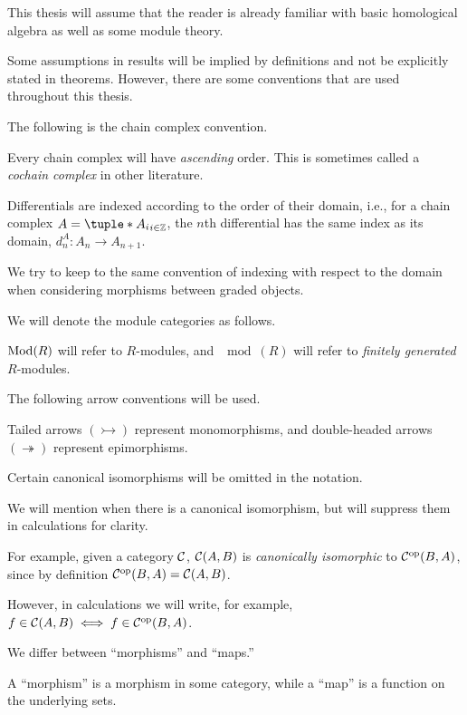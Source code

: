 This thesis will assume that the reader is already familiar with basic homological algebra as well as some module theory.

Some assumptions in results will be implied by definitions and not be explicitly stated in theorems. However, there are some conventions that are used throughout this thesis.

The following is the chain complex convention.
\begin{notation}
    \label{not:chain_complex}
    Every chain complex will have \emph{ascending} order. This is sometimes called a \emph{cochain complex} in other literature.

    Differentials are indexed according to the order of their domain, i.e., for a chain complex \( A = \tuple*{A_i}_{i \in \Zb} \), the \( n \)th differential has the same index as its domain, \( d_n^A: A_n \to A_{n + 1} \).
    
    We try to keep to the same convention of indexing with respect to the domain when considering morphisms between graded objects.
\end{notation}

We will denote the module categories as follows.
\begin{notation}
    \( \operatorname{Mod}(R) \) will refer to \( R \)-modules, and \( \mod(R) \) will refer to \emph{finitely generated} \( R \)-modules.
\end{notation}

The following arrow conventions will be used.
\begin{notation}
    Tailed arrows \( (\rightarrowtail) \) represent monomorphisms, and double-headed arrows \( (\twoheadrightarrow) \) represent epimorphisms.
\end{notation}

Certain canonical isomorphisms will be omitted in the notation.
\begin{notation}
    \label{not:suppress_canonical_isomorphisms}
    We will mention when there is a canonical isomorphism, but will suppress them in calculations for clarity.

    For example, given a category \( {\mathcal{C}} \), \( {\mathcal{C}}(A, B) \) is \emph{canonically isomorphic} to \( {\mathcal{C}}^{\operatorname{op}}(B, A) \), since by definition \( {\mathcal{C}}^{\operatorname{op}}(B, A) = {\mathcal{C}}(A, B) \).

    However, in calculations we will write, for example, \( f \in {\mathcal{C}}(A, B) \iff f \in {\mathcal{C}}^{\operatorname{op}}(B, A) \).
\end{notation}

We differ between ``morphisms'' and ``maps.''
\begin{notation}
    A ``morphism'' is a morphism in some category, while a ``map'' is a function on the underlying sets.
\end{notation}

